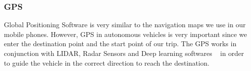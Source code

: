 \subsubsection{GPS}
Global Positioning Software is very similar to the navigation maps we use in our mobile phones. However, GPS in autonomous vehicles is very important since we enter the destination point and the start point of our trip. The GPS works in conjunction with LIDAR, Radar Sensors and Deep learning softwares ~\cite{GPS} in order to guide the vehicle in the correct direction to reach the destination.
